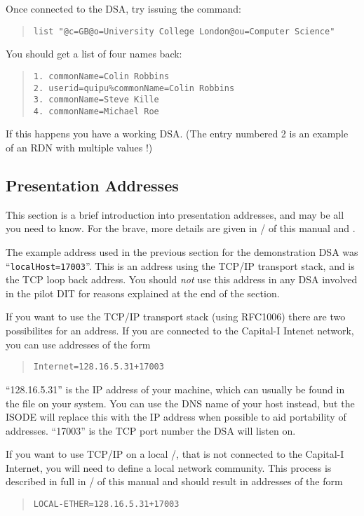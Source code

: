 Once connected to the DSA, try issuing the
command:
\begin{quote}\small\begin{verbatim}
list "@c=GB@o=University College London@ou=Computer Science"
\end{verbatim}\end{quote}
You should get a list of four names 
back:
\begin{quote}\begin{verbatim}
1. commonName=Colin Robbins
2. userid=quipu%commonName=Colin Robbins
3. commonName=Steve Kille
4. commonName=Michael Roe
\end{verbatim}\end{quote}
If this happens you have a working DSA.
(The entry numbered 2 is an example of an RDN with multiple values !)

\subsection{Presentation Addresses}
\label{DSA:address}

This section is a brief introduction into presentation addresses, and
may be all you need to know.  For the brave, more details are given in
\voltwo/ of this manual and
\cite{String.Addresses}.

The example address used in the previous section for the demonstration
DSA was ``\verb+localHost=17003+''.  This is an address using the
TCP/IP transport stack, and is the TCP loop back address.  You should
{\em not} use this address in any DSA involved in the pilot DIT for reasons
explained at the end of the section.

If you want to use the TCP/IP transport stack (using RFC1006) there are two
possibilites for an address.  
If you are connected to the Capital-I Intenet network, you can use
addresses of the form
\begin{quote}\begin{verbatim}
Internet=128.16.5.31+17003
\end{verbatim}\end{quote}
``128.16.5.31'' is the IP address of your machine, which can usually be
found in the  file on your system.  You can use the
DNS name of your host instead, but the ISODE will replace this with the
IP address when possible to aid portability of addresses.
``17003'' is the TCP port number the DSA will listen on.

If you want to use TCP/IP on a local \ethernet/, that is not connected to
the Capital-I Internet, you will need to define a local network
community. 
This process is described in full in \voltwo/ of this
manual and should result in addresses of the form
\begin{quote}\begin{verbatim}
LOCAL-ETHER=128.16.5.31+17003
\end{verbatim}\end{quote}

